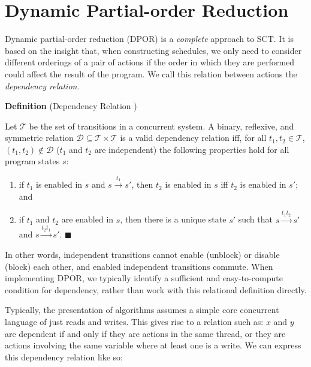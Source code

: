 \section{Dynamic Partial-order Reduction}
\label{sec:sct-dpor}

Dynamic partial-order reduction (DPOR) \parencite{flanagan2005,godefroid1996} is a
\emph{complete} approach to SCT\@.  It is based on the insight that, when
constructing schedules, we only need to consider different orderings of a pair
of actions if the order in which they are performed could affect the
result of the program.  We call this relation between actions
the \emph{dependency relation}.

\begin{displayquote}
  \textbf{Definition} (Dependency Relation \parencite{flanagan2005})

  \noindent
  Let $\mathcal T$ be the set of transitions in a concurrent system.  A binary,
  reflexive, and symmetric relation $\mathcal D \subseteq \mathcal
  T \times \mathcal T$ is a valid dependency relation iff, for all $t_{1},
  t_{2} \in \mathcal T$, $(t_{1}, t_{2}) \notin \mathcal D$ ($t_{1}$ and $t_{2}$
  are independent) the following properties hold for all program states $s$:

  \begin{enumerate}
  \item if $t_{1}$ is enabled in $s$ and $s \xrightarrow{t_{1}} s'$, then
    $t_{2}$ is enabled in $s$ iff $t_{2}$ is enabled in $s'$; and

  \item if $t_{1}$ and $t_{2}$ are enabled in $s$, then there is a unique state
    $s'$ such that $s \xrightarrow{t_{1}t_{2}} s'$ and
    $s \xrightarrow{t_{2}t_{1}} s'$.
    \hfill$\blacksquare$
  \end{enumerate}
\end{displayquote}

In other words, independent transitions cannot enable (unblock) or
disable (block) each other, and enabled independent transitions
commute.  When implementing DPOR, we typically identify a sufficient
and easy-to-compute condition for dependency, rather than work with
this relational definition directly.

Typically, the presentation of algorithms assumes a simple core
concurrent language of just reads and writes.  This gives rise to a
relation such as: $x$ and $y$ are dependent if and only if they are
actions in the same thread, or they are actions involving the same
variable where at least one is a write.  We can express this
dependency relation like so:


